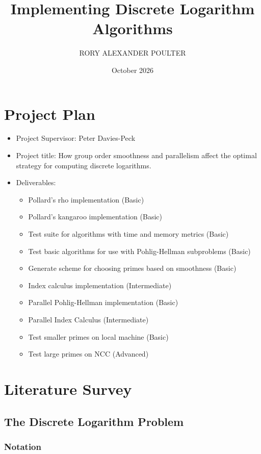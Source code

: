 \documentclass{article}
\title{Implementing Discrete Logarithm Algorithms}
\author{RORY ALEXANDER POULTER}
\date{October 2026}
\begin{document}
\maketitle

\section{Project Plan}

\begin{itemize}
    \item Project Supervisor: Peter Davies-Peck
    \item Project title: How group order smoothness and parallelism affect the optimal strategy for computing discrete logarithms.
    \item {Deliverables:
        \begin{itemize}
            \item Pollard's rho implementation (Basic)
            \item Pollard's kangaroo implementation (Basic)
            \item Test suite for algorithms with time and memory metrics (Basic)
            \item Test basic algorithms for use with Pohlig-Hellman subproblems (Basic)
            \item Generate scheme for choosing primes based on smoothness (Basic)
            \item Index calculus implementation (Intermediate)
            \item Parallel Pohlig-Hellman implementation (Basic)
            \item Parallel Index Calculus (Intermediate)
            \item Test smaller primes on local machine (Basic)
            \item Test large primes on NCC (Advanced)
        \end{itemize}}
\end{itemize}



\newpage
\section{Literature Survey}
\subsection{The Discrete Logarithm Problem}
\subsubsection{Notation}
\end{document}
